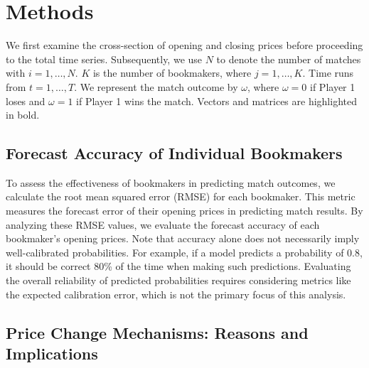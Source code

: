 \documentclass[webpdf,modern,medium]{oup-authoring-template}
\theoremstyle{thmstyleone}%
\theoremstyle{thmstyletwo}%
\theoremstyle{thmstylethree}%
\begin{document}


\section{Methods}

We first examine the cross-section of opening and closing prices before proceeding to the total time series. Subsequently, we use $N$ to denote the number of matches with $i = 1, \ldots, N$.  $K$ is the number of bookmakers, where $j = 1, \ldots, K$. Time runs from $t = 1, \ldots, T$. We represent the match outcome by $\omega$, where $\omega=0$ if Player 1 loses and $\omega=1$ if Player 1 wins the match. Vectors and matrices are highlighted in bold.

    \subsection{Forecast Accuracy of Individual Bookmakers}

        To assess the effectiveness of bookmakers in predicting match outcomes, we calculate the root mean squared error (RMSE) for each bookmaker. This metric measures the forecast error of their opening prices in predicting match results. By analyzing these RMSE values, we evaluate the forecast accuracy of each bookmaker's opening prices.
        Note that accuracy alone does not necessarily imply well-calibrated probabilities. For example, if a model predicts a probability of 0.8, it should be correct 80\% of the time when making such predictions. Evaluating the overall reliability of predicted probabilities requires considering metrics like the expected calibration error, which is not the primary focus of this analysis.


    \subsection{Price Change Mechanisms: Reasons and Implications}
\end{document}
